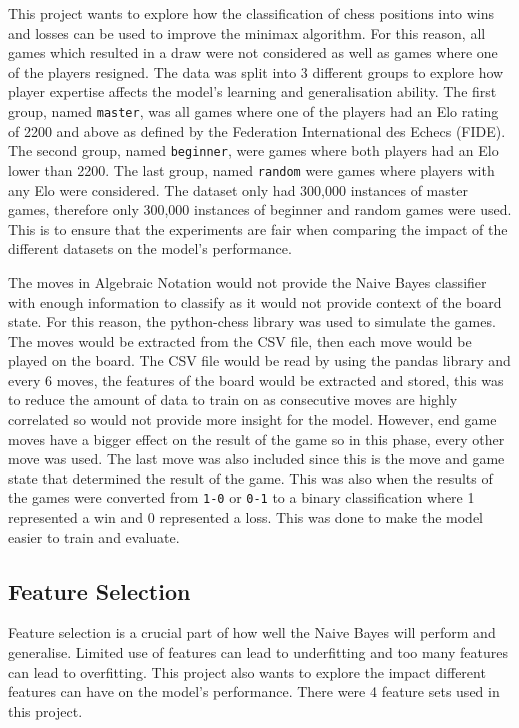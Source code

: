 This project wants to explore how the classification of chess positions into wins and losses can be used to improve the minimax algorithm. For this reason, all games which resulted in a draw were not considered as well as games where one of the players resigned. The data was split into 3 different groups to explore how player expertise affects the model's learning and generalisation ability. The first group, named \texttt{master}, was all games where one of the players had an Elo rating of 2200 and above as defined by the Federation International des Echecs (FIDE). The second group, named \texttt{beginner}, were games where both players had an Elo lower than 2200. The last group, named \texttt{random} were games where players with any Elo were considered. The dataset only had 300,000 instances of master games, therefore only 300,000 instances of beginner and random games were used. This is to ensure that the experiments are fair when comparing the impact of the different datasets on the model's performance. 

The moves in Algebraic Notation would not provide the Naive Bayes classifier with enough information to classify as it would not provide context of the board state. For this reason, the python-chess library was used to simulate the games. The moves would be extracted from the CSV file, then each move would be played on the board. The CSV file would be read by using the pandas library and every 6 moves, the features of the board would be extracted and stored, this was to reduce the amount of data to train on as consecutive moves are highly correlated so would not provide more insight for the model. However, end game moves have a bigger effect on the result of the game so in this phase, every other move was used. The last move was also included since this is the move and game state that determined the result of the game. This was also when the results of the games were converted from \texttt{1-0} or \texttt{0-1} to a binary classification where 1 represented a win and 0 represented a loss. This was done to make the model easier to train and evaluate.

\subsection{Feature Selection}

Feature selection is a crucial part of how well the Naive Bayes will perform and generalise. Limited use of features can lead to underfitting and too many features can lead to overfitting. This project also wants to explore the impact different features can have on the model's performance. There were 4 feature sets used in this project. 

